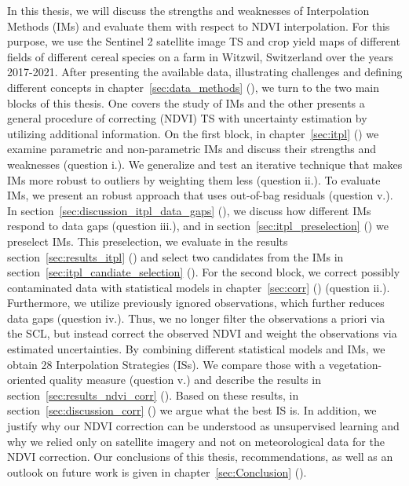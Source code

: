 In this thesis, we will discuss the strengths and weaknesses of Interpolation Methods ({{IM}}s) and evaluate them with respect to NDVI interpolation. For this purpose, we use the Sentinel 2 satellite image {TS} and crop yield maps of different fields of different cereal species on a farm in Witzwil, Switzerland over the years 2017-2021. After presenting the available data, illustrating challenges and defining different concepts in chapter~\ref{sec:data_methods} (), we turn to the two main blocks of this thesis. One covers the study of IMs and the other presents a general procedure of correcting (NDVI) TS with uncertainty estimation by utilizing additional information.
On the first block, in chapter~\ref{sec:itpl} () we examine parametric and non-parametric {{IM}}s and discuss their strengths and weaknesses (question i.). We generalize and test an iterative technique that makes IMs more robust to outliers by weighting them less (question ii.). To evaluate IMs, we present an robust approach that uses out-of-bag residuals (question v.). In section~\ref{sec:discussion_itpl_data_gaps} (), we discuss how different {{IM}}s respond to data gaps (question iii.), and in section~\ref{sec:itpl_preselection} () we preselect {{IM}}s. This preselection, we evaluate in the results section~\ref{sec:results_itpl} () and select two candidates from the {{IM}}s in section~\ref{sec:itpl_candiate_selection} ().
For the second block, we correct possibly contaminated data with statistical models in chapter~\ref{sec:corr} () (question ii.). Furthermore, we utilize previously ignored observations, which further reduces data gaps (question iv.). Thus, we no longer filter the observations a priori via the SCL, but instead correct the observed NDVI and weight the observations via estimated uncertainties. By combining different statistical models and IMs, we obtain 28 Interpolation Strategies ({{ISs}}). We compare those with a vegetation-oriented quality measure (question v.) and describe the results in section~\ref{sec:results_ndvi_corr} (). Based on these results, in section~\ref{sec:discussion_corr} () we argue what the best {{IS}} is. In addition, we justify why our NDVI correction can be understood as unsupervised learning and why we relied only on satellite imagery and not on meteorological data for the NDVI correction.
Our conclusions of this thesis, recommendations, as well as an outlook on future work is given in chapter~\ref{sec:Conclusion} (). 








